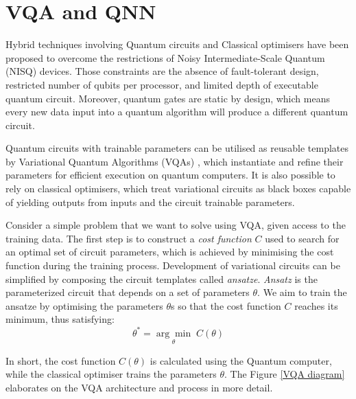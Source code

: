 \section{VQA and QNN}

Hybrid techniques involving Quantum circuits and Classical optimisers have been proposed to overcome the restrictions of Noisy Intermediate-Scale Quantum (NISQ) \cite{brooksQuantumSupremacyHunt2019} devices. 
Those constraints are the absence of fault-tolerant design, restricted number of qubits per processor, and limited depth of executable quantum circuit. 
Moreover, quantum gates are static by design, which means every new data input into a quantum algorithm will produce a different quantum circuit.

Quantum circuits with trainable parameters can be utilised as reusable templates by Variational Quantum Algorithms (VQAs) \cite{cerezo2021variational}, which instantiate and refine their parameters for efficient execution on quantum computers.
It is also possible to rely on classical optimisers, which treat variational circuits as black boxes capable of yielding outputs from inputs and the circuit trainable parameters.

Consider a simple problem that we want to solve using VQA, given access to the training data.
The first step is to construct a \textit{cost function} $C$ used to search for an optimal set of circuit parameters, which is achieved by minimising the cost function during the training process.
Development of variational circuits can be simplified by composing the circuit templates called \textit{ansatze}. 
\textit{Ansatz} is the parameterized circuit that depends on a set of parameters $\theta$. We aim to train the ansatze by optimising the parameters $\theta$s so that the cost function $C$ reaches its minimum, thus satisfying:
\begin{equation}
    \theta^* = \underset{\theta}{\arg \min} \;C(\theta)
    \label{optimize theta with ansatz}
\end{equation}

In short, the cost function $C(\theta)$ is calculated using the Quantum computer, while the classical optimiser trains the parameters $\theta$. The Figure \ref{VQA diagram} elaborates on the VQA architecture and process in more detail.

